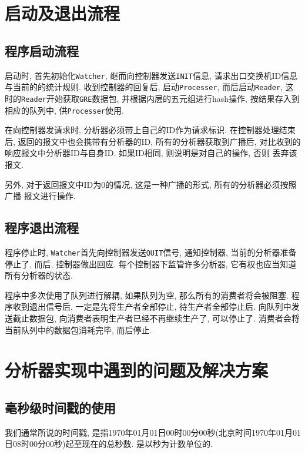 \section{启动及退出流程}

\subsection{程序启动流程}
\label{sec:分析器启动过程}

  启动时, 首先初始化\texttt{Watcher}, 继而向控制器发送\texttt{INIT}信息,
请求出口交换机ID信息与当前的的统计规则. 收到控制器的回复后,
启动\texttt{Processer}, 而后启动\texttt{Reader}, 这
时的\texttt{Reader}开始获取\texttt{GRE}数据包, 并根据内层的五元组进行hash操作,
按结果存入到相应的队列中, 供\texttt{Processer}使用.

  在向控制器发请求时, 分析器必须带上自己的ID作为请求标识.
在控制器处理结束后, 返回的报文中也会携带有分析器的ID, 所有的分析器获取到广播后,
对比收到的响应报文中分析器ID与自身ID. 如果ID相同, 则说明是对自己的操作, 否则
丢弃该报文.

  另外, 对于返回报文中ID为0的情况, 这是一种广播的形式, 所有的分析器必须按照广播
报文进行操作.

\subsection{程序退出流程}

程序停止时, \texttt{Watcher}首先向控制器发送\texttt{QUIT}信号,
通知控制器, 当前的分析器准备停止了, 而后, 控制器做出回应.
每个控制器下监管许多分析器, 它有权也应当知道所有分析器的状态.

程序中多次使用了队列进行解耦, 如果队列为空, 那么所有的消费者将会被阻塞.
程序收到退出信号后, 一定是先将生产者全部停止, 待生产者全部停止后.
向队列中发送截止数据包, 向消费者表明生产者已经不再继续生产了,
可以停止了. 消费者会将当前队列中的数据包消耗完毕, 而后停止.

\section{分析器实现中遇到的问题及解决方案}

\subsection{毫秒级时间戳的使用}

我们通常所说的时间戳,
是指1970年01月01日00时00分00秒(北京时间1970年01月01日08时00分00秒)起至现在的总秒数.
是以秒为计数单位的.

